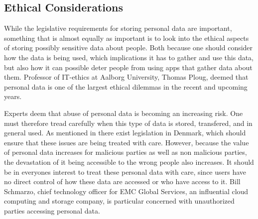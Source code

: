 
\subsection{Ethical Considerations}
\label{sub:ethical_considerations}

While the legislative requirements for storing personal data are important, something that is almost equally as important is to look into the ethical aspects of storing possibly sensitive data about people. Both because one should consider how the data is being used, which implications it has to gather and use this data, but also how it can possible deter people from using apps that gather data about them. Professor of IT-ethics at Aalborg University, Thomas Ploug, deemed that personal data is one of the largest ethical dilemmas in the recent and upcoming years.


Experts deem that abuse of personal data is becoming an increasing risk. One must therefore tread carefully when this type of data is stored, transfered, and in general used. As mentioned in  there exist legislation in Denmark, which should ensure that these issues are being treated with care. However, because the value of personal data increases for malicious parties as well as non malicious parties, the devastation of it being accessible to the wrong people also increases. It should be in everyones interest to treat these personal data with care, since users have no direct control of how these data are accessed or who have access to it. Bill Schmarzo, chief technology officer for EMC Global Services, an influential cloud computing and storage company, is particular concerned with unauthorized parties accessing personal data.


